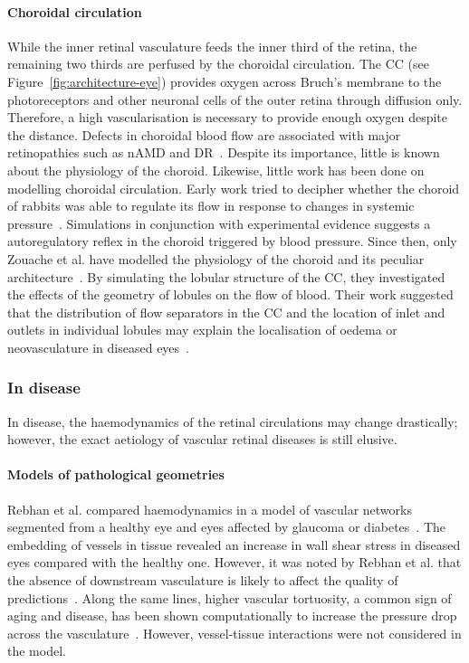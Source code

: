 \documentclass{article}
\begin{document}
\paragraph*{Choroidal circulation}
While the inner retinal vasculature feeds the inner third of the retina, the remaining two thirds are perfused by the choroidal circulation.
The CC (see Figure~\ref{fig:architecture-eye}) provides oxygen across Bruch's membrane to the photoreceptors and other neuronal cells of the outer retina through diffusion only.
Therefore, a high vascularisation is necessary to provide enough oxygen despite the distance.
Defects in choroidal blood flow are associated with major retinopathies such as nAMD and DR~\cite{Pemp_2008}.
Despite its importance, little is known about the physiology of the choroid.
Likewise, little work has been done on modelling choroidal circulation.
Early work tried to decipher whether the choroid of rabbits was able to regulate its flow in response to changes in systemic pressure~\cite{Kiel_1992}.
Simulations in conjunction with experimental evidence suggests a autoregulatory reflex in the choroid triggered by blood pressure.
Since then, only Zouache et al. have modelled the physiology of the choroid and its peculiar architecture~\cite{Zouache_2015,Zouache_2016}.
By simulating the lobular structure of the CC, they investigated the effects of the geometry of lobules on the flow of blood.
Their work suggested that the distribution of flow separators in the CC and the location of inlet and outlets in individual lobules may explain the localisation of oedema or neovasculature in diseased eyes~\cite{Zouache_2015}.


\subsubsection{In disease}

In disease, the haemodynamics of the retinal circulations may change drastically; however, the exact aetiology of vascular retinal diseases is still elusive.

\paragraph*{Models of pathological geometries} 

Rebhan et al. compared haemodynamics in a model of vascular networks segmented from a healthy eye and eyes affected by glaucoma or diabetes~\cite{Rebhan_2019}.
The embedding of vessels in tissue revealed an increase in wall shear stress in diseased eyes compared with the healthy one.
However, it was noted by Rebhan et al. that the absence of downstream vasculature is likely to affect the quality of predictions~\cite{Rebhan_2019}.
Along the same lines, higher vascular tortuosity, a common sign of aging and disease, has been shown computationally to increase the pressure drop across the vasculature~\cite{Malek_2014}.
However, vessel-tissue interactions were not considered in the model.
\end{document}
